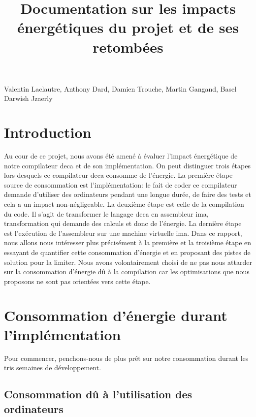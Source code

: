\documentclass[12pt, a4paper, one side]{article}
\title{Documentation sur les impacts énergétiques du projet et de ses retombées}
\author{}
\date{}
\begin{document}
\maketitle

\begin{center}
    Valentin Laclautre, Anthony Dard, Damien Trouche, Martin Gangand, Basel Darwish Jzaerly
\end{center}

\tableofcontents

\newpage

\section{Introduction}

Au cour de ce projet, nous avons été amené à évaluer l'impact énergétique de notre compilateur deca et de son implémentation. On peut distinguer trois étapes lors desquels ce compilateur deca consomme de l'énergie. La première étape source de consommation est l'implémentation: le fait de coder ce compilateur demande d'utiliser des ordinateurs pendant une longue durée, de faire des tests et cela a un impact non-négligeable. La deuxième étape est celle de la compilation du code. Il s'agit de transformer le langage deca en assembleur ima, transformation qui demande des calculs et donc de l'énergie. La dernière étape est l'exécution de l'assembleur sur une machine virtuelle ima. Dans ce rapport, nous allons nous intéresser plus précisément à la première et la troisième étape en essayant de quantifier cette consommation d'énergie et en proposant des pistes de solution pour la limiter. Nous avons volontairement choisi de ne pas nous attarder sur la consommation d'énergie dû à la compilation car les optimisations que nous proposons ne sont pas orientées vers cette étape.



\section{Consommation d'énergie durant l'implémentation}

Pour commencer, penchons-nous de plus prêt sur notre consommation durant les tris semaines de développement.

\subsection{Consommation dû à l'utilisation des ordinateurs}
\end{document}
